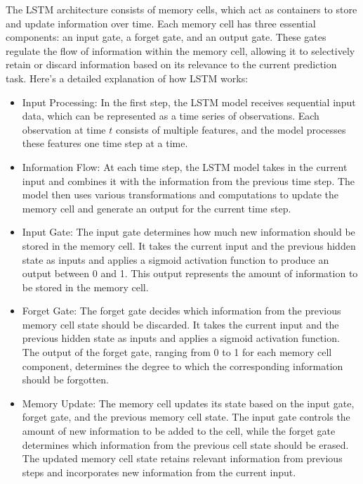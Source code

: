 \documentclass[conference]{IEEEtran}
\begin{document}
The LSTM architecture consists of memory cells, which act as containers to store and update information over time. Each memory cell has three essential components: an input gate, a forget gate, and an output gate. These gates regulate the flow of information within the memory cell, allowing it to selectively retain or discard information based on its relevance to the current prediction task.
Here's a detailed explanation of how LSTM works:
\begin{itemize}
  \item Input Processing: In the first step, the LSTM model receives sequential input data, which can be represented as a time series of observations. Each observation at time $t$ consists of multiple features, and the model processes these features one time step at a time.
  
  \item Information Flow: At each time step, the LSTM model takes in the current input and combines it with the information from the previous time step. The model then uses various transformations and computations to update the memory cell and generate an output for the current time step.
  
  \item Input Gate: The input gate determines how much new information should be stored in the memory cell. It takes the current input and the previous hidden state as inputs and applies a sigmoid activation function to produce an output between 0 and 1. This output represents the amount of information to be stored in the memory cell.
  
  \item Forget Gate: The forget gate decides which information from the previous memory cell state should be discarded. It takes the current input and the previous hidden state as inputs and applies a sigmoid activation function. The output of the forget gate, ranging from 0 to 1 for each memory cell component, determines the degree to which the corresponding information should be forgotten.
  
  \item Memory Update: The memory cell updates its state based on the input gate, forget gate, and the previous memory cell state. The input gate controls the amount of new information to be added to the cell, while the forget gate determines which information from the previous cell state should be erased. The updated memory cell state retains relevant information from previous steps and incorporates new information from the current input.
  

\end{itemize}
\end{document}
